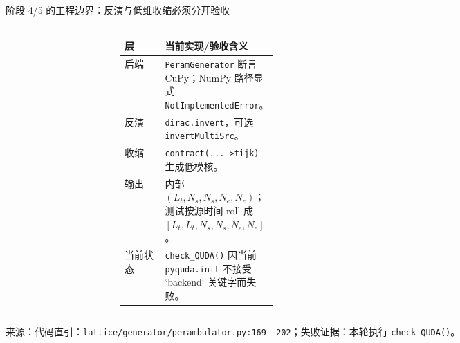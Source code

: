 \documentclass[UTF8,aspectratio=169,11pt]{ctexbeamer}
\newcommand{\source}[1]{%
  \vspace{0.06em}\par{\raggedright\scriptsize\color{muted}来源：#1\par}}
\newcommand{\codepath}[1]{\nolinkurl{#1}}
\begin{document}
\begin{frame}[t]{阶段 4/5 的工程边界：反演与低维收缩必须分开验收}
  \begin{columns}[T,totalwidth=\textwidth]
    \begin{column}{0.54\textwidth}
      
    \end{column}
    \begin{column}{0.42\textwidth}
      \small
      \begin{tabularx}{\linewidth}{@{}L{0.32\linewidth}Y@{}}
        \toprule
        层 & 当前实现/验收含义 \\
        \midrule
        后端 & \texttt{PeramGenerator} 断言 CuPy；NumPy 路径显式 \texttt{NotImplementedError}。 \\
        反演 & \texttt{dirac.invert}，可选 \texttt{invertMultiSrc}。 \\
        收缩 & \texttt{contract(...->tijk)} 生成低模核。 \\
        输出 & 内部 $(L_t,N_s,N_s,N_e,N_e)$；测试按源时间 roll 成 $[L_t,L_t,N_s,N_s,N_e,N_e]$。 \\
        当前状态 & \texttt{check\_QUDA()} 因当前 \texttt{pyquda.init} 不接受 `backend` 关键字而失败。 \\
        \bottomrule
      \end{tabularx}
      \vspace{0cm}
    \end{column}
  \end{columns}
  \vspace{-0.02cm}
  \source{代码直引：\codepath{lattice/generator/perambulator.py:169--202}；失败证据：本轮执行 \texttt{check\_QUDA()}。}
\end{frame}
\end{document}
